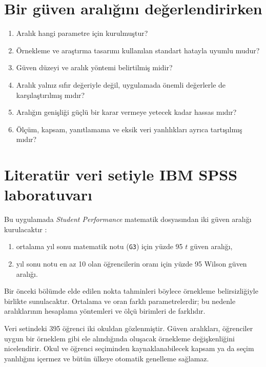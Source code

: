 \section{Bir güven aralığını değerlendirirken}

\begin{enumerate}
  \item Aralık hangi parametre için kurulmuştur?
  \item Örnekleme ve araştırma tasarımı kullanılan standart hatayla uyumlu mudur?
  \item Güven düzeyi ve aralık yöntemi belirtilmiş midir?
  \item Aralık yalnız sıfır değeriyle değil, uygulamada önemli değerlerle de karşılaştırılmış mıdır?
  \item Aralığın genişliği güçlü bir karar vermeye yetecek kadar hassas mıdır?
  \item Ölçüm, kapsam, yanıtlamama ve eksik veri yanlılıkları ayrıca tartışılmış mıdır?
\end{enumerate}

\section{Literatür veri setiyle IBM SPSS laboratuvarı}

Bu uygulamada \emph{Student Performance} matematik dosyasından iki güven
aralığı kurulacaktır \cite{cortez2008data,cortezsilva2008}:

\begin{enumerate}
  \item ortalama yıl sonu matematik notu (\texttt{G3}) için yüzde 95 $t$ güven aralığı,
  \item yıl sonu notu en az 10 olan öğrencilerin oranı için yüzde 95 Wilson güven aralığı.
\end{enumerate}

Bir önceki bölümde elde edilen nokta tahminleri böylece örnekleme
belirsizliğiyle birlikte sunulacaktır. Ortalama ve oran farklı parametrelerdir;
bu nedenle aralıklarının hesaplama yöntemleri ve ölçü birimleri de farklıdır.

\begin{researchbox}
Veri setindeki 395 öğrenci iki okuldan gözlenmiştir. Güven aralıkları,
öğrenciler uygun bir örneklem gibi ele alındığında oluşacak örnekleme
değişkenliğini nicelendirir. Okul ve öğrenci seçiminden kaynaklanabilecek
kapsam ya da seçim yanlılığını içermez ve bütün ülkeye otomatik genelleme
sağlamaz.
\end{researchbox}

